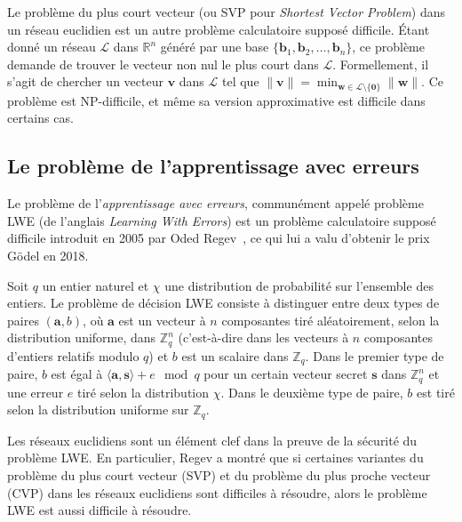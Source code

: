 Le problème du plus court vecteur (ou SVP pour \emph{Shortest Vector Problem}) dans un réseau euclidien est un autre problème calculatoire supposé difficile. Étant donné un réseau $\mathcal{L}$ dans $\mathbb{R}^n$ généré par une base $\{\mathbf{b}_1, \mathbf{b}_2, \ldots, \mathbf{b}_n\}$, ce problème demande de trouver le vecteur non nul le plus court dans $\mathcal{L}$. Formellement, il s’agit de chercher un vecteur $\mathbf{v}$ dans $\mathcal{L}$ tel que $\|\mathbf{v}\| = \min_{\mathbf{w} \in \mathcal{L} \setminus \{ \mathbf{0} \}} \|\mathbf{w}\|$. Ce problème est NP-difficile, et même sa version approximative est difficile dans certains cas. 

\subsection{Le problème de l’apprentissage avec erreurs}

Le problème de l’\emph{apprentissage avec erreurs}, communément appelé problème LWE (de l’anglais \emph{Learning With Errors}) est un problème calculatoire supposé difficile introduit en 2005 par Oded Regev~\cite{STOC:Regev05}, ce qui lui a valu d’obtenir le prix Gödel en 2018.




Soit $q$ un entier naturel et $\chi$ une distribution de probabilité sur l'ensemble des entiers. Le problème de décision LWE consiste à distinguer entre deux types de paires $(\mathbf{a}, b)$, où $\mathbf{a}$ est un vecteur à $n$ composantes tiré aléatoirement, selon la distribution uniforme, dans $\mathbb{Z}_q^n$ (c’est-à-dire dans les vecteurs à $n$ composantes d’entiers relatifs modulo $q$) et $b$ est un scalaire dans $\mathbb{Z}_q$. Dans le premier type de paire, $b$ est égal à $\langle\mathbf{a},\mathbf{s}\rangle + e \mod q$ pour un certain vecteur secret $\mathbf{s}$ dans $\mathbb{Z}_q^n$ et une erreur $e$ tiré selon la distribution $\chi$. Dans le deuxième type de paire, $b$ est tiré selon la distribution uniforme sur $\mathbb{Z}_q$.


Les réseaux euclidiens sont un élément clef dans la preuve de la sécurité du problème LWE. En particulier, Regev a montré que si certaines variantes du problème du plus court vecteur (SVP) et du problème du plus proche vecteur (CVP) dans les réseaux euclidiens sont difficiles à résoudre, alors le problème LWE est aussi difficile à résoudre.

